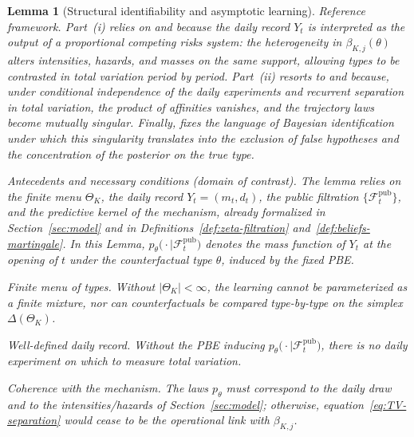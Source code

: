 \documentclass[review,authoryear,12pt]{elsarticle}
\theoremstyle{plain}
\newtheorem{lemma}[theorem]{Lemma}
\theoremstyle{definition}
\newcommand{\ThetaK}{\Theta_K}
\newcommand{\1}{\mathbf{1}}
\begin{document}
\begin{lemma}[Structural identifiability and asymptotic learning]\label{lem:hazard-separation}
\normalfont
Reference framework. Part~\textup{(i)} relies on \citet{Cox1972} and \citet{Bradburn2003} because the daily record $Y_t$ is interpreted as the output of a proportional competing risks system: the heterogeneity in $\beta_{K,j}(\theta)$ alters intensities, hazards, and masses on the same support, allowing types to be contrasted in total variation period by period. Part~\textup{(ii)} resorts to \citet{Kakutani1948} and \citet{Shiryaev2019Probability} because, under conditional independence of the daily experiments and recurrent separation in total variation, the product of affinities vanishes, and the trajectory laws become mutually singular. Finally, \citet{Schervish1995Theory} fixes the language of Bayesian identification under which this singularity translates into the exclusion of false hypotheses and the concentration of the posterior on the true type.

\medskip
\noindent Antecedents and necessary conditions \textup{(}domain of contrast\textup{)}.
The lemma relies on the finite menu $\ThetaK$, the daily record $Y_t=(m_t,d_t)$, the public filtration $\{\mathcal{F}_t^{\mathrm{pub}}\}$, and the predictive kernel of the mechanism, already formalized in Section~\ref{sec:model} and in Definitions~\ref{def:zeta-filtration} and~\ref{def:beliefs-martingale}. In this Lemma, $p_\theta\bigl(\cdot\mid \mathcal{F}_t^{\mathrm{pub}}\bigr)$ denotes the mass function of $Y_t$ at the opening of $t$ under the counterfactual type $\theta$, induced by the fixed PBE.
\begin{list}{}{%
  \setlength{\leftmargin}{2.25em}%
  \setlength{\labelwidth}{2.25em}%
  \setlength{\labelsep}{0.45em}%
  \setlength{\itemsep}{0.35em}%
  \setlength{\parsep}{0pt}%
  \setlength{\topsep}{0.25em}%
}
\item[\textup{(N1)}] \textup{Finite menu of types.}\quad
Without $\lvert\ThetaK\rvert<\infty$, the learning cannot be parameterized as a finite mixture, nor can counterfactuals be compared type-by-type on the simplex $\Delta(\ThetaK)$.
\item[\textup{(N2)}] \textup{Well-defined daily record.}\quad
Without the PBE inducing $p_\theta\bigl(\cdot\mid\mathcal{F}_t^{\mathrm{pub}}\bigr)$, there is no daily experiment on which to measure total variation.
\item[\textup{(N3)}] \textup{Coherence with the mechanism.}\quad
The laws $p_\theta$ must correspond to the daily draw and to the intensities/hazards of Section~\ref{sec:model}; otherwise, equation~\eqref{eq:TV-separation} would cease to be the operational link with $\beta_{K,j}$.
\end{list}


\end{lemma}
\end{document}
